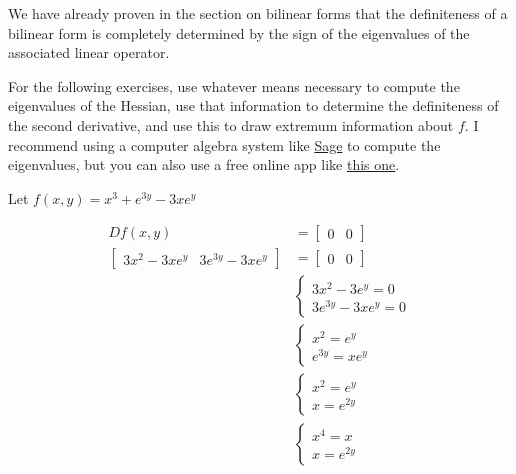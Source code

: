 \documentclass{ximera}
\begin{document}
	We have already proven in the section on bilinear forms that the definiteness of a bilinear form is completely determined by the sign
	of the eigenvalues of the associated linear operator.
	
	For the following exercises, use whatever means necessary to compute the eigenvalues of the Hessian, use that information to determine the 
	definiteness of the second derivative, and use this to draw extremum information about $f$.  I recommend using a computer algebra system like 
	\href{http://www.sagemath.org/}{Sage} to compute the eigenvalues, 
	but you can also use a free online app like \href{http://www.bluebit.gr/matrix-calculator/}{this one}. 
	
	\begin{question}
		Let $f(x,y) = x^3+e^{3y}-3xe^{y}$
		\begin{solution}
			\begin{hint}
				\begin{align*}
					Df(x,y)  &= \begin{bmatrix} 0 & 0\end{bmatrix}\\
					\begin{bmatrix} 3x^2-3xe^y & 3e^{3y}-3xe^y\end{bmatrix} &= \begin{bmatrix} 0 & 0\end{bmatrix}\\
					&\begin{cases}
						3x^2-3e^y = 0\\
						3e^{3y}-3xe^y = 0
					\end{cases}\\
					&\begin{cases}
						x^2=e^y\\
						e^{3y}=xe^y
					\end{cases}\\
					&\begin{cases}
						x^2=e^y\\
						x=e^{2y}
					\end{cases}\\
					&\begin{cases}
						x^4=x\\
						x=e^{2y}
					\end{cases}
				\end{align*}
				

\end{hint}
\end{solution}
\end{question}
\end{document}
